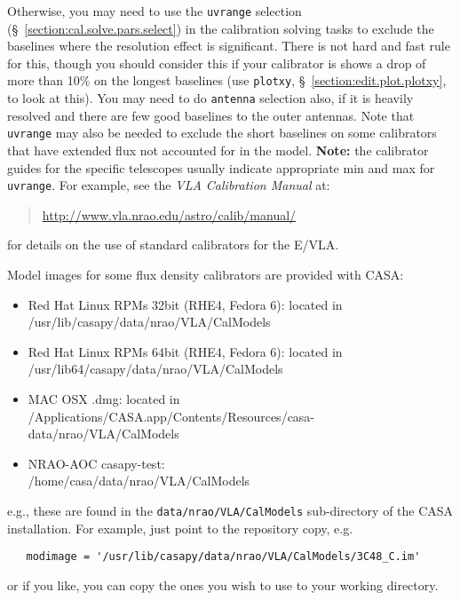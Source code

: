 Otherwise, you may
need to use the {\tt uvrange} selection
(\S~\ref{section:cal.solve.pars.select}) 
in the calibration solving tasks to exclude the baselines
where the resolution effect is significant.  There is not hard
and fast rule for this, though you should consider this if your
calibrator is shows a drop of more than 10\% on the longest baselines
(use {\tt plotxy}, \S~\ref{section:edit.plot.plotxy}, to look at this).
You may need to do {\tt antenna} selection also, if it is heavily
resolved and there are few good baselines to the outer antennas.
Note that {\tt uvrange} may also be needed to exclude the short
baselines on some calibrators that have extended flux not accounted
for in the model.
{\bf Note:} the calibrator guides for the specific telescopes usually
indicate appropriate min and max for {\tt uvrange}. For example,
see the {\em VLA Calibration Manual} at:
\begin{quote}
   \url{http://www.vla.nrao.edu/astro/calib/manual/}
\end{quote}
for details on the use of standard calibrators for the E/VLA.

Model images for some flux density calibrators are provided with CASA:
\begin{itemize}
   \item Red Hat Linux RPMs 32bit (RHE4, Fedora 6): 
         located in\\ /usr/lib/casapy/data/nrao/VLA/CalModels
   \item Red Hat Linux RPMs 64bit (RHE4, Fedora 6): 
         located in\\ /usr/lib64/casapy/data/nrao/VLA/CalModels
   \item MAC OSX .dmg: located in\\ /Applications/CASA.app/Contents/Resources/casa-data/nrao/VLA/CalModels
   \item NRAO-AOC casapy-test:\\ /home/casa/data/nrao/VLA/CalModels
\end{itemize}
e.g., these are found in the {\tt data/nrao/VLA/CalModels}
sub-directory of the CASA installation.  For example, just point to the
repository copy, e.g.
\small
\begin{verbatim}
   modimage = '/usr/lib/casapy/data/nrao/VLA/CalModels/3C48_C.im'
\end{verbatim}
\normalsize
or if you like, you can copy the ones you wish to use to your working
directory.

